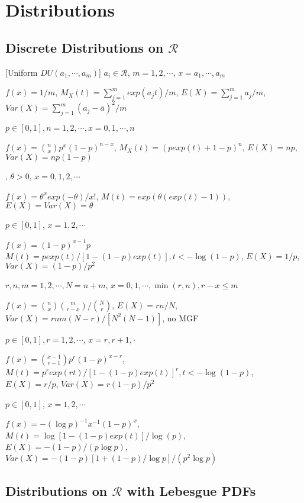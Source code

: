 \section{Distributions}

\subsection{Discrete Distributions on $\mathcal{R}$}

[Uniform $DU(a_1, \cdots, a_m)$] $a_i \in \mathcal{R}$, $m=1, 2, \cdots$, $x=a_1, \cdots, a_m$

$f(x)=1/m$,
$M_X(t) = \sum_{j=1}^m exp(a_jt)/m$,
$E(X)=\sum_{j=1}^ma_j/m$,
$Var(X)=\sum_{j=1}^m(a_j-\bar{a})^2/m$

\pline
[Binomial $Bi(p, n)$] $p\in[0, 1], n=1, 2, \cdots, x=0, 1, \cdots, n$

$f(x)=\binom{n}{x}p^x(1-p)^{n-x}$,
$M_X(t)=(pexp(t)+1-p)^n$,
$E(X)=np$,
$Var(X)=np(1-p)$

, $\theta>0$, $x=0, 1, 2, \cdots$

$f(x)=\theta^xexp(-\theta)/x!$,
$M(t)=exp(\theta(exp(t)-1))$,
$E(X)=Var(X)=\theta$

\pline
[Geometric $G(p)$] $p\in[0, 1]$, $x=1, 2, \cdots$

$f(x)=(1-p)^{x-1}p$
$M(t)=pexp(t)/[1-(1-p)exp(t)], t<-\log(1-p)$,
$E(X)=1/p$,
$Var(X)=(1-p)/p^2$

 $r, n, m=1, 2, \cdots, N=n+m$, $x=0, 1, \cdots, \min(r, n), r-x \leq m$

$f(x)=\binom{n}{x}\binom{m}{r-x}/\binom{N}{r}$,
$E(X)=rn/N$,
$Var(X)=rnm(N-r)/[N^2(N-1)]$, no MGF

 $p\in[0, 1], r=1, 2, \cdots$, $x=r, r+1, \cdot$

$f(x)=\binom{x-1}{r-1}p^r(1-p)^{x-r}$,
$M(t)=p^rexp(rt)/[1-(1-p)exp(t)]^r, t<-\log(1-p)$,
$E(X)=r/p$,
$Var(X)=r(1-p)/p^2$

 $p\in[0, 1]$, $x=1, 2, \cdots$

$f(x)=-(\log p)^{-1}x^{-1}(1-p)^x$,
$M(t)=\log[1-(1-p)exp(t)]/\log(p)$,
$E(X)=-(1-p)/(p\log p)$,\\
$Var(X)=-(1-p)[1+(1-p)/\log p]/(p^2\log p)$

\subsection{Distributions on $\mathcal{R}$ with Lebesgue PDFs}

